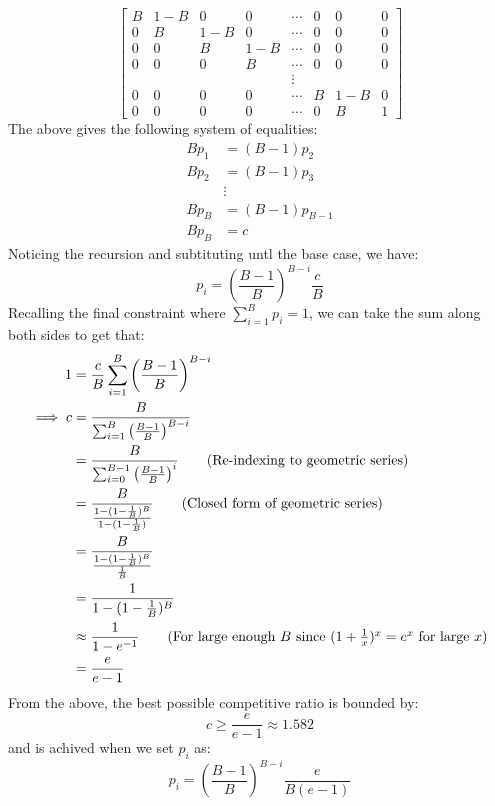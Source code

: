 \documentclass[12pt]{exam}
\begin{document}
\begin{questions}
\begin{solution}
\begin{enumerate}[label=(\alph*)]
\[\begin{bmatrix}
            B & 1-B & 0 & 0 & \cdots & 0 & 0 & 0 \\
            0 & B & 1-B & 0 & \cdots & 0 & 0 & 0 \\
            0 & 0 & B & 1-B & \cdots & 0 & 0 & 0 \\
            0 & 0 & 0 & B & \cdots & 0 & 0 & 0 \\
            &&&& \vdots &&& \\
            0 & 0 & 0 & 0 & \cdots & B & 1-B & 0 \\
            0 & 0 & 0 & 0 & \cdots & 0 & B & 1
          \end{bmatrix}
      \]
      The above gives the following system of equalities:
      \begin{align*}
        Bp_1 &= (B-1)p_2 \\
        Bp_2 & = (B-1)p_3 \\
        &\vdots \\
        Bp_B &= (B-1)p_{B-1} \\
        Bp_B &= c
      \end{align*} 
      Noticing the recursion and subtituting untl the base case, we have:
      \[
        p_i = \left(\frac{B-1}{B}\right)^{B-i}\frac{c}{B}
      \]
      Recalling the final constraint where $\sum_{i=1}^B p_i = 1$, we can take the sum along both sides to get that:
      \begin{align*}
        1 &= \frac{c}{B} \sum_{i=1}^B \left( \frac{B-1}{B} \right)^{B-i} \\
      \implies c &= \frac{B}{\sum_{i=1}^B \left( \frac{B-1}{B} \right)^{B-i}} \\
      &= \frac{B}{\sum_{i=0}^{B-1} \left( \frac{B-1}{B} \right)^i} \tag{Re-indexing to geometric series} \\
      &= \frac{B}{\frac{1 - (1 - \frac{1}{B})^B}{1 - (1 - \frac{1}{B})}} \tag{Closed form of geometric series} \\
      &= \frac{B}{\frac{1 - (1 - \frac{1}{B})^B}{\frac{1}{B}}} \\
      &= \frac{1}{1 - (1 - \frac{1}{B})^B} \\
      &\approx \frac{1}{1 - e^{-1}} \tag{For large enough $B$ since $(1 + \frac{1}{x})^x = e^x$ for large $x$} \\
      &= \frac{e}{e - 1}
      \end{align*}
      From the above, the best possible competitive ratio is bounded by:
      \[
        c \geq \frac{e}{e - 1} \approx 1.582
      \]
      and is achived when we set $p_i$ as:
      \[
        p_i = \left(\frac{B-1}{B}\right)^{B-i}\frac{e}{B(e-1)}
      \]
  \end{enumerate}
\end{solution}



\end{questions}
\end{document}
